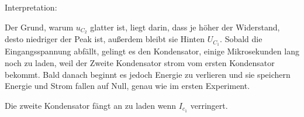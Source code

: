 Interpretation:

Der Grund, warum $u_{C_2}$ glatter ist, liegt darin, dass je höher der Widerstand, desto niedriger der Peak ist, außerdem bleibt sie Hinten $U_{C_1}$. Sobald die Eingangsspannung abfällt, gelingt es den Kondensator, einige Mikrosekunden lang noch zu laden, weil der Zweite Kondensator strom vom ersten Kondensator bekommt. Bald danach beginnt es jedoch Energie zu verlieren und sie speichern Energie und Strom fallen auf Null, genau wie im ersten Experiment.

Die zweite Kondensator fängt an zu laden wenn $I_{c_1}$ verringert.
%
%
%
%
%
%
%